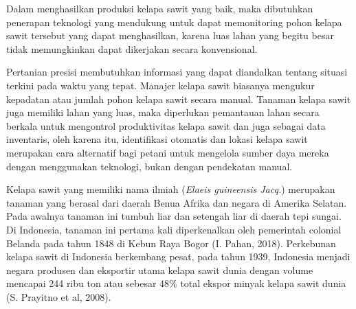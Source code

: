 Dalam menghasilkan produksi kelapa sawit yang baik, maka dibutuhkan penerapan teknologi yang mendukung untuk dapat memonitoring pohon kelapa sawit tersebut yang dapat menghasilkan, karena luas lahan yang begitu besar tidak memungkinkan dapat dikerjakan secara konvensional.

Pertanian presisi membutuhkan informasi yang dapat diandalkan tentang situasi terkini pada waktu yang tepat. Manajer kelapa sawit biasanya mengukur kepadatan atau jumlah pohon kelapa sawit secara manual. Tanaman kelapa sawit juga memiliki lahan yang luas, maka diperlukan pemantauan lahan secara berkala untuk mengontrol produktivitas kelapa sawit dan juga sebagai data inventaris, oleh karena itu, identifikasi otomatis dan lokasi kelapa sawit merupakan cara alternatif bagi petani untuk mengelola sumber daya mereka dengan menggunakan teknologi, bukan dengan pendekatan manual.

Kelapa sawit yang memiliki nama ilmiah (\textit{Elaeis guineensis Jacq.}) merupakan tanaman yang berasal dari daerah Benua Afrika dan negara di Amerika Selatan. Pada awalnya tanaman ini tumbuh liar dan setengah liar di daerah tepi sungai. Di Indonesia, tanaman ini pertama kali diperkenalkan oleh pemerintah colonial Belanda pada tahun 1848 di Kebun Raya Bogor (I. Pahan, 2018). Perkebunan kelapa sawit di Indonesia berkembang pesat, pada tahun 1939, Indonesia menjadi negara produsen dan eksportir utama kelapa sawit dunia dengan volume mencapai 244 ribu ton atau sebesar 48\% total ekspor minyak kelapa sawit dunia (S. Prayitno et al, 2008).


